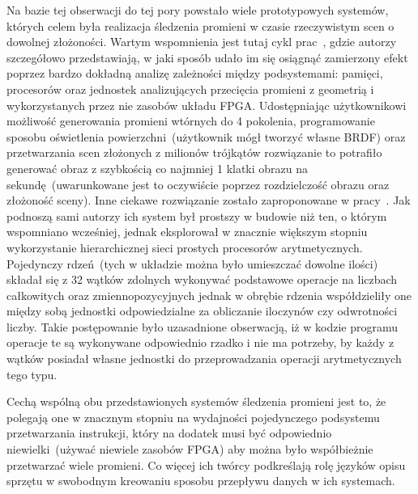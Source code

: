 Na bazie tej obserwacji do tej pory powstało wiele prototypowych systemów, których celem była realizacja śledzenia promieni w czasie rzeczywistym scen o dowolnej złożoności. Wartym wspomnienia jest tutaj cykl prac~\cite{Realtime_FPGA}\cite{RPU}\cite{Realtime_ASIC}, gdzie autorzy szczegółowo przedstawiają, w jaki sposób udało im się osiągnąć zamierzony efekt poprzez bardzo dokładną analizę zależności między podsystemami: pamięci, procesorów oraz jednostek analizujących przecięcia promieni z geometrią i wykorzystanych przez nie zasobów układu FPGA. Udostępniając użytkownikowi możliwość generowania promieni wtórnych do 4 pokolenia, programowanie sposobu oświetlenia powierzchni~(użytkownik mógł tworzyć własne BRDF) oraz przetwarzania scen złożonych z milionów trójkątów rozwiązanie to potrafiło generować obraz z szybkością co najmniej 1 klatki obrazu na sekundę~(uwarunkowane jest to oczywiście poprzez rozdzielczość obrazu oraz złożoność sceny). Inne ciekawe rozwiązanie zostało zaproponowane w pracy~\cite{TRAX}. Jak podnoszą sami autorzy ich system był prostszy w budowie niż ten, o którym wspomniano wcześniej, jednak eksplorował w znacznie większym stopniu wykorzystanie hierarchicznej sieci prostych procesorów arytmetycznych. Pojedynczy rdzeń~(tych w układzie można było umieszczać dowolne ilości) składał się z 32 wątków zdolnych wykonywać podstawowe operacje na liczbach całkowitych oraz zmiennopozycyjnych jednak w obrębie rdzenia współdzieliły one między sobą jednostki odpowiedzialne za obliczanie iloczynów czy odwrotności liczby. Takie postępowanie było uzasadnione obserwacją, iż w kodzie programu operacje te są wykonywane odpowiednio rzadko i nie ma potrzeby, by każdy z wątków posiadał własne jednostki do przeprowadzania operacji arytmetycznych tego typu.

Cechą wspólną obu przedstawionych systemów śledzenia promieni jest to, że polegają one w znacznym stopniu na wydajności pojedynczego podsystemu przetwarzania instrukcji, który na dodatek musi być odpowiednio niewielki~(używać niewiele zasobów FPGA) aby można było współbieżnie przetwarzać wiele promieni. Co więcej ich twórcy podkreślają rolę języków opisu sprzętu w swobodnym kreowaniu sposobu przepływu danych w ich systemach.


